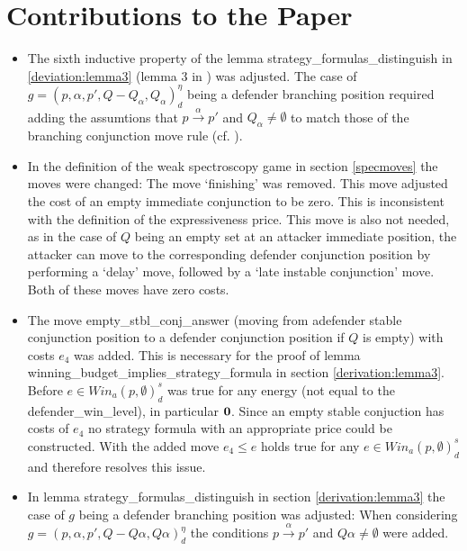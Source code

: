 \section{Contributions to the Paper}
\begin{itemize}
\item The sixth inductive property of the lemma strategy\_formulas\_distinguish in \ref{deviation:lemma3} 
(lemma 3 in \cite{bisping2023lineartimebranchingtime}) was adjusted.
The case of $g=(p,\alpha ,p', Q- Q_\alpha, Q_\alpha)_d^\eta$ being a defender branching position
required adding the assumtions that $p \overset{\alpha}{\longrightarrow} p'$ and $Q_\alpha \neq \emptyset$
to match those of the branching conjunction move rule (cf. \cite[p. 13]{bisping2023lineartimebranchingtime}). 

\item In the definition of the weak spectroscopy game in section \ref{specmoves} the moves were changed: 
The move `finishing' was removed. This move adjusted the cost of an empty immediate conjunction to be zero.
This is inconsistent with the definition of the expressiveness price. This move is also not needed, as in the case of $Q$ being an empty set at an attacker immediate position, the attacker can move to the corresponding
defender conjunction position by performing a `delay' move, followed by a `late instable conjunction' move. Both of these moves have zero costs.

\item The move empty\_stbl\_conj\_answer (moving from adefender stable conjunction position to a defender conjunction
position if $Q$ is empty) with costs $e_4$ was added. This is necessary for the proof of lemma 
winning\_budget\_implies\_strategy\_formula in section \ref{derivation:lemma3}. Before 
$e \in Win_a (p, \emptyset)_d^s $ was true for any energy (not equal to the defender\_win\_level), in particular $\bold{0}$. 
Since an empty stable conjuction has costs of $e_4$ no strategy formula with an appropriate price could be constructed. 
With the added move $e_4 \leq e $ holds true for any $e \in Win_a (p, \emptyset)_d^s $ and therefore resolves this issue.

\item In lemma strategy\_formulas\_distinguish in section \ref{derivation:lemma3} the case of $g$ being a defender branching position was adjusted: 
When considering $g=(p,\alpha ,p', Q- Q \alpha, Q \alpha)_d^\eta$ the conditions $p \overset{\alpha}{\longrightarrow} p'$ and $Q \alpha \neq \emptyset$ were added. 
\end{itemize}